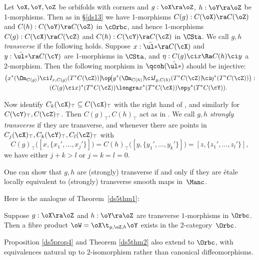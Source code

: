 \documentclass{article}
\begin{document}
\begin{dfn} Let $\oX,\oY,\oZ$ be orbifolds with corners and
$g:\oX\ra\oZ$, $h:\oY\ra\oZ$ be 1-morphisms. Then as in \S\ref{ds13}
we have 1-morphisms $C(g):C(\oX)\ra C(\oZ)$ and $C(h):C(\oY)\ra
C(\oZ)$ in $\cOrbc$, and hence 1-morphisms $C(g):C(\cX)\ra C(\cZ)$
and $C(h):C(\cY)\ra C(\cZ)$ in $\CSta$. We call $g,h$ {\it
transverse\/} if the following holds. Suppose $x:\bar{\ul *}\ra
C(\cX)$ and $y:\bar{\ul *}\ra C(\cY)$ are 1-morphisms in $\CSta$,
and $\eta:C(g)\ci x\Ra C(h)\ci y$ a 2-morphism. Then the following
morphism in $\qcoh(\bar{\ul*})$ should be injective:
\begin{align*}
\bigl(x^*(\Om_{C(g)})\ci &I_{x,C(g)}(T^*C(\cZ))\bigr)\!\op\!
\bigl(y^*(\Om_{C(h)})\!\ci\! I_{y,C(h)}(T^*C(\cZ))\!\ci\!
\eta^*(T^*C(\cZ))\bigr):\\
&(C(g)\ci x)^*(T^*C(\cZ)) \longra x^*(T^*C(\cX))\op y^*(T^*C(\cY)).
\end{align*}

Now identify $C_k(\cX)_\top\subseteq C(\cX)_\top$ with the right
hand of , and similarly for $C(\cY)_\top,C(\cZ)_\top$.
Then $C(g)_\top,C(h)_\top$ act as in . We call $g,h$
{\it strongly transverse\/} if they are transverse, and whenever
there are points in $C_j(\cX)_\top,C_k(\cY)_\top,C_l(\cZ)_\top$ with
\begin{equation*}
C(g)_\top\bigl([x,\{x_1',\ldots,x_j'\}]\bigr)\!=\!
C(h)_\top\bigl([y,\{y_1',\ldots,y_k'\}]\bigr)\!=\!
[z,\{z_1',\ldots,z_l'\}],
\end{equation*}
we have either $j+k>l$ or $j=k=l=0$.

One can show that $g,h$ are (strongly) transverse if and only if
they are \'etale locally equivalent to (strongly) transverse smooth
maps in~$\Manc$.
\label{ds12def7}
\end{dfn}

Here is the analogue of Theorem~\ref{ds5thm1}:

\begin{thm} Suppose $g:\oX\ra\oZ$ and\/ $h:\oY\ra\oZ$ are
transverse $1$-morphisms in $\Orbc$. Then a fibre product\/
$\oW=\oX\t_{g,\oZ,h}\oY$ exists in the $2$-category~$\Orbc$.
\label{ds12thm3}
\end{thm}

Proposition \ref{ds5prop4} and Theorem \ref{ds5thm2} also extend to
$\Orbc$, with equivalences natural up to 2-isomorphism rather than
canonical diffeomorphisms.
\end{document}
